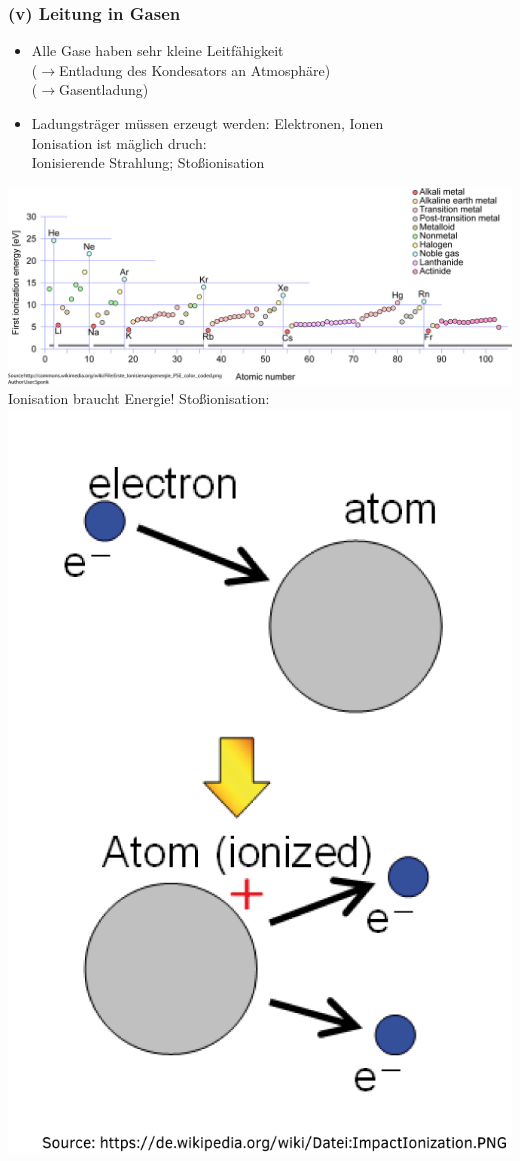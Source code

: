 \documentclass[11pt]{article}
\begin{document}
	\subsubsection*{(v) Leitung in Gasen}
	\begin{itemize}
		\item Alle Gase haben sehr kleine Leitfähigkeit\\ ($ \longrightarrow $Entladung des Kondesators an Atmosphäre) \\ ($ \longrightarrow $Gasentladung)
		\item Ladungsträger müssen erzeugt werden: Elektronen, Ionen\\
		Ionisation ist mäglich druch:\\
		\indent Ionisierende Strahlung; Stoßionisation
	\end{itemize}
		\includegraphics[width=\linewidth]{skizzen/15/VL07/3}\\
	Ionisation braucht Energie!\hfill \break
	Stoßionisation:\\ \includegraphics[width=0.5\linewidth]{skizzen/15/VL07/4} \hfill \break
\end{document}
